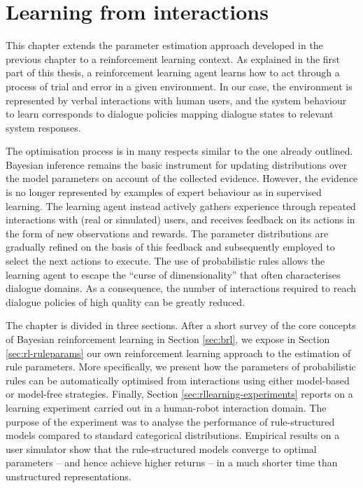 \chapter{Learning from interactions}
\label{chap:rllearning}
This chapter extends the parameter estimation approach developed in the previous chapter to a reinforcement learning context.  As explained in the first part of this thesis, a reinforcement learning agent learns how to act through a process of trial and error in a given environment.  In our case, the environment is represented by verbal interactions with human users, and the system behaviour to learn corresponds to dialogue policies mapping dialogue states to relevant system responses. 

The optimisation process is in many respects similar to the one already outlined. Bayesian inference remains the basic instrument for updating distributions over the model parameters on account of the collected evidence.  However, the evidence is no longer represented by examples of expert behaviour as in supervised learning. The learning agent instead actively gathers experience through repeated interactions with (real or simulated) users, and receives feedback on its actions in the form of new observations and rewards. The parameter distributions are gradually refined on the basis of this feedback and subsequently employed to select the next actions to execute. The use of probabilistic rules allows the learning agent to  escape the ``curse of dimensionality'' that often characterises dialogue domains. As a consequence, the number of interactions required to reach dialogue policies of high quality can be greatly reduced. 

The chapter is divided in three sections.  After a short survey of the core concepts of Bayesian reinforcement learning in Section \ref{sec:brl}, we expose in Section \ref{sec:rl-ruleparams} our own reinforcement learning approach to the estimation of rule parameters.  More specifically, we present how the parameters of probabilistic rules can be automatically optimised from interactions using either model-based or model-free strategies. Finally, Section \ref{sec:rllearning-experiments} reports on a learning experiment carried out in a human-robot interaction domain. The purpose of the experiment was to analyse the performance of rule-structured models compared to standard categorical distributions. Empirical results on a user simulator show that the rule-structured models converge to optimal parameters -- and hence achieve higher returns -- in a much shorter time than unstructured representations. 

